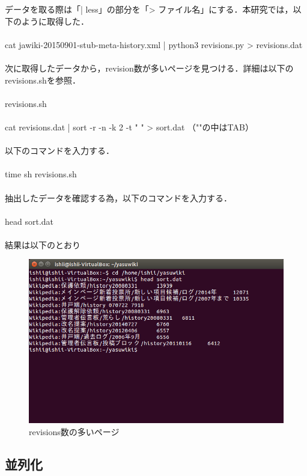 データを取る際は「| less」の部分を「> ファイル名」にする．本研究では，以下のように取得した． \\
\\
cat jawiki-20150901-stub-meta-history.xml | python3 revisions.py > revisions.dat \\
\\
次に取得したデータから，revision数が多いページを見つける．詳細は以下のrevisions.shを参照． \\
\\
revisions.sh \\
\\
cat revisions.dat | sort -r -n -k 2 -t "     " > sort.dat （""の中はTAB） \\
\\
以下のコマンドを入力する．\\
\\
time sh revisions.sh \\
\\
抽出したデータを確認する為，以下のコマンドを入力する． \\
\\
head sort.dat \\
\\
結果は以下のとおり

\begin{figure}[H]
\centering
\includegraphics[width=14cm]{head_sort.png}
\caption{revisions数の多いページ}\label{サンプル図}
\end{figure}




\subsection{並列化}

